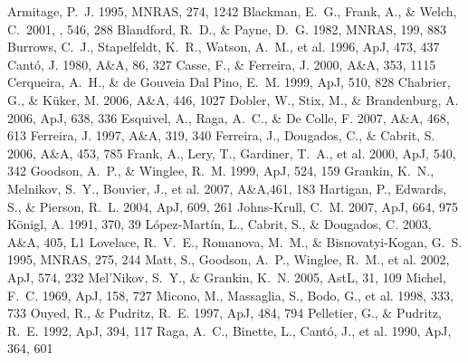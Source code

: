 \documentclass{emulateapj}
\begin{document}
\begin{thebibliography}{99}
 Armitage, P.~J. 1995, MNRAS, 274, 1242
 Blackman, E.~G., Frank, A., \& Welch, C.\ 2001, \apj, 546, 288 
 Blandford, R.~D., \& Payne, D.~G. 1982, MNRAS, 199, 883
 Burrows, C.~J., Stapelfeldt, K.~R., Watson, A.~M., et al. 1996, ApJ, 473, 437
 Cant\'o, J. 1980, A\&A, 86, 327
  Casse, F., \& Ferreira, J. 2000, A\&A, 353, 1115
 Cerqueira, A.~H., \& de Gouveia Dal Pino, E.~M. 1999, ApJ, 510, 828
 Chabrier, G., \& K\"uker, M. 2006, A\&A, 446, 1027
 Dobler, W., Stix, M., \& Brandenburg, A. 2006, ApJ, 638, 336
 Esquivel, A., Raga, A.~C., \& De Colle, F. 2007, A\&A, 468, 613
  Ferreira, J. 1997, A\&A, 319, 340
 Ferreira, J., Dougados, C., \& Cabrit, S. 2006, A\&A, 453, 785
 Frank, A., Lery, T., Gardiner, T.~A., et al. 2000, ApJ, 540, 342
 Goodson, A.~P., \& Winglee, R.~M. 1999, ApJ, 524, 159
 Grankin, K.~N., Melnikov, S.~Y., Bouvier, J., et al. 2007, A\&A,461, 183
 Hartigan, P., Edwards, S., \&  Pierson, R.~L. 2004, ApJ, 609, 261
 Johns-Krull, C.~M. 2007, ApJ, 664, 975
 K\"onigl, A. 1991, 370, 39
 L\'opez-Mart\'in, L., Cabrit, S., \& Dougados, C. 2003, A\&A, 405, L1
 Lovelace, R.~V.~E., Romanova, M.~M., \& Bisnovatyi-Kogan, G.~S. 1995, MNRAS, 275, 244
 Matt, S., Goodson, A.~P., Winglee, R.~M., et al. 2002, ApJ, 574, 232
 Mel'Nikov, S.~Y., \& Grankin, K.~N. 2005, AstL, 31, 109
 Michel, F.~C. 1969, ApJ, 158, 727
 Micono, M., Massaglia, S., Bodo, G., et al. 1998, 333, 733
 Ouyed, R., \& Pudritz, R.~E. 1997, ApJ, 484, 794
 Pelletier, G., \& Pudritz, R.~E. 1992, ApJ, 394, 117
 Raga, A.~C., Binette, L., Cant\'o, J., et al. 1990, ApJ, 364, 601

\end{thebibliography}
\end{document}
